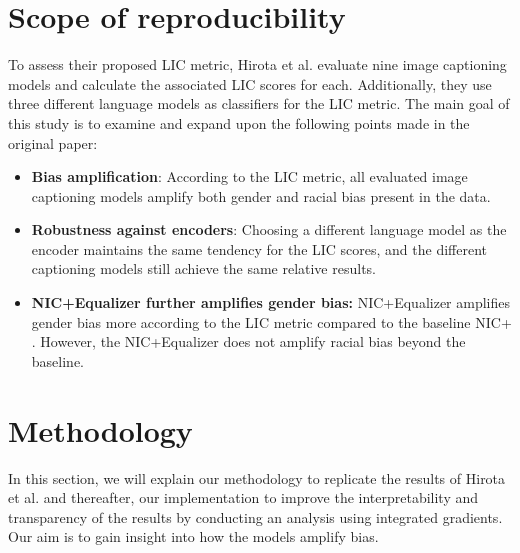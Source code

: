 \section{Scope of reproducibility}
\label{sec:claims}
To assess their proposed LIC metric, Hirota et al. evaluate nine image captioning models and calculate the associated LIC scores for each. Additionally, they use three different language models as classifiers for the LIC metric. The main goal of this study is to examine and expand upon the following points made in the original paper:
\begin{itemize}
    \item \textbf{Bias amplification}: According to the LIC metric, all evaluated image captioning models amplify both gender and racial bias present in the data.

    \item \textbf{Robustness against encoders}: Choosing a different language model as the encoder maintains the same tendency for the LIC scores, and the different captioning models still achieve the same relative results.

    
    \item \textbf{NIC+Equalizer further amplifies gender bias:} 
    NIC+Equalizer \cite{NICplusNICEqualizer:2018} amplifies gender bias more according to the LIC metric compared to the baseline NIC+ \cite{NICplusNICEqualizer:2018}. However, the NIC+Equalizer does not amplify racial bias beyond the baseline. 
\end{itemize}

\section{Methodology}
In this section, we will explain our methodology to replicate the results of Hirota et al. and thereafter, our implementation to improve the interpretability and transparency of the results by conducting an analysis using integrated gradients. Our aim is to gain insight into how the models amplify bias.\newline

